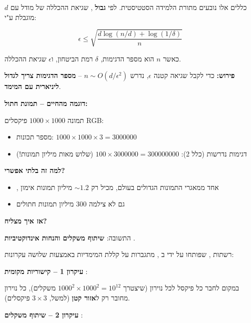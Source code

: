 כללים אלו נובעים מתורת הלמידה הסטטיסטית. לפי \textbf{גבול } \cite{vapnik1971}, שגיאת ההכללה של מודל עם  $d$ מוגבלת ע"י:

\begin{equation}
\epsilon \leq \sqrt{\frac{d \log(n/d) + \log(\num{1}/\delta)}{n}}
\end{equation}

כאשר $n$ הוא מספר הדגימות, $\delta$ רמת הביטחון, ו\en{-}$\epsilon$ שגיאת ההכללה.

\textbf{פירוש:} כדי לקבל שגיאה קטנה $\epsilon$, נדרש $n \sim O(d / \epsilon^2)$ – \textbf{מספר הדגימות צריך לגדול ליניארית עם המימד}.

\textbf{דוגמה מהחיים – תמונת חתול:}

תמונה $\num{1000} \times \num{1000}$ פיקסלים RGB:
\begin{itemize}
\item מספר תכונות: $\num{1000} \times \num{1000} \times \num{3} = \num{3000000}$
\item דגימות נדרשות (כלל \num{2}): $\num{100} \times \num{3000000} = \num{300000000}$ (שלוש מאות מיליון תמונות!)
\end{itemize}

\textbf{למה זה בלתי אפשרי?}

\begin{itemize}
\item {}, אחד ממאגרי התמונות הגדולים בעולם, מכיל רק $\sim \num{1.2}$ מיליון תמונות אימון \cite{deng2009}
\item גם  לא צילמה \num{300} מיליון תמונות חתולים
\end{itemize}

\textbf{אז איך  מצליח?}

התשובה: \textbf{שיתוף משקלים והנחות אינדוקטיביות} \cite{lecun1998, goodfellow2016}.


רשתות , שפותחו על ידי  ב\en{-} \cite{lecun1989}, מתגברות על קללת המימדיות באמצעות שלושה עקרונות:

\textbf{עיקרון \num{1} – קישוריות מקומית} :

במקום לחבר כל פיקסל לכל נוירון (שיצטרך $\num{1000}^2 \times \num{1000}^2 = \num{10}^{12}$ משקלים), כל נוירון מחובר רק ל\textbf{אזור קטן} (למשל, $\num{3} \times \num{3}$ פיקסלים).

\textbf{עיקרון \num{2} – שיתוף משקלים} :

